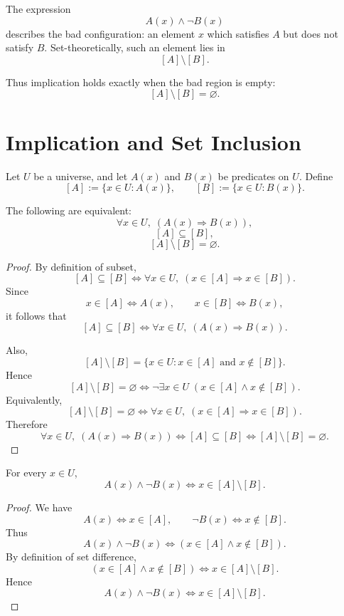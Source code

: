 \documentclass{article}
\begin{document}
	The expression
	\[
	A(x)\land \neg B(x)
	\]
	describes the bad configuration: an element \(x\) which satisfies \(A\) but does not satisfy \(B\). Set-theoretically, such an element lies in
	\[
	[A]\setminus[B].
	\]
	
	Thus implication holds exactly when the bad region is empty:
	\[
	[A]\setminus[B]=\varnothing.
	\]
	\section*{Implication and Set Inclusion}
	
	Let \(U\) be a universe, and let \(A(x)\) and \(B(x)\) be predicates on \(U\). Define
	\[
	[A]:=\{x\in U: A(x)\},
	\qquad
	[B]:=\{x\in U: B(x)\}.
	\]
	
	\begin{theorem}
		The following are equivalent:
		\[
		\forall x\in U,\; (A(x)\Rightarrow B(x)),
		\]
		\[
		[A]\subseteq[B],
		\]
		\[
		[A]\setminus[B]=\varnothing.
		\]
	\end{theorem}
	
	\begin{proof}
		By definition of subset,
		\[
		[A]\subseteq[B]
		\iff
		\forall x\in U,\; (x\in[A]\Rightarrow x\in[B]).
		\]
		Since
		\[
		x\in[A]\iff A(x),
		\qquad
		x\in[B]\iff B(x),
		\]
		it follows that
		\[
		[A]\subseteq[B]
		\iff
		\forall x\in U,\; (A(x)\Rightarrow B(x)).
		\]
		
		Also,
		\[
		[A]\setminus[B]
		=
		\{x\in U: x\in[A]\text{ and }x\notin[B]\}.
		\]
		Hence
		\[
		[A]\setminus[B]=\varnothing
		\iff
		\neg \exists x\in U\; (x\in[A]\land x\notin[B]).
		\]
		Equivalently,
		\[
		[A]\setminus[B]=\varnothing
		\iff
		\forall x\in U,\; (x\in[A]\Rightarrow x\in[B]).
		\]
		Therefore
		\[
		\forall x\in U,\; (A(x)\Rightarrow B(x))
		\iff
		[A]\subseteq[B]
		\iff
		[A]\setminus[B]=\varnothing.
		\]
	\end{proof}
	
	\begin{proposition}
		For every \(x\in U\),
		\[
		A(x)\land \neg B(x)
		\iff
		x\in[A]\setminus[B].
		\]
	\end{proposition}
	
	\begin{proof}
		We have
		\[
		A(x)\iff x\in[A],
		\qquad
		\neg B(x)\iff x\notin[B].
		\]
		Thus
		\[
		A(x)\land \neg B(x)
		\iff
		(x\in[A]\land x\notin[B]).
		\]
		By definition of set difference,
		\[
		(x\in[A]\land x\notin[B])
		\iff
		x\in[A]\setminus[B].
		\]
		Hence
		\[
		A(x)\land \neg B(x)
		\iff
		x\in[A]\setminus[B].
		\]
	\end{proof}
	
\end{document}
